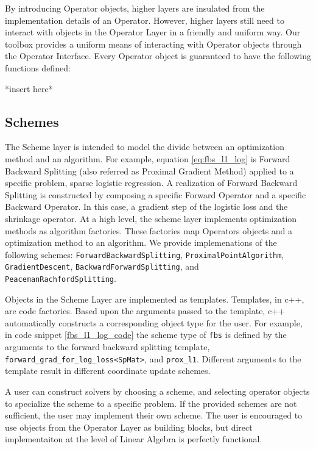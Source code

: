 By introducing Operator objects, higher layers are insulated from the implementation details of an Operator. 
However, higher layers still need to interact with objects in the Operator Layer in a friendly and uniform way.
Our toolbox provides a uniform means of interacting with Operator objects through the Operator Interface.
Every Operator object is guaranteed to have the following functions defined:

*insert here*

\subsection{Schemes}

The Scheme layer is intended to model the divide between an optimization method and an algorithm. 
For example, equation \ref{eq:fbs_l1_log} is Forward Backward Splitting (also referred as Proximal Gradient Method) applied to a specific problem, sparse logistic regression.
 A realization of  Forward Backward Splitting is constructed by composing a specific Forward Operator and a specific Backward Operator.
 In this case, a gradient step of the logistic loss and the shrinkage operator. 
At a high level, the scheme layer implements optimization methods as algorithm factories.
These factories map Operators objects and a optimization method to an algorithm.  
We provide implemenations of the following schemes: \texttt{ForwardBackwardSplitting}, \texttt{ProximalPointAlgorithm},  \texttt{GradientDescent}, \texttt{BackwardForwardSplitting}, and \texttt{PeacemanRachfordSplitting}.

Objects in the Scheme Layer are implemented as templates.
Templates, in c++, are code factories.
Based upon the arguments passed to the template, c++ automatically constructs a corresponding object type for the user.
For example, in code snippet \ref{fbs_l1_log_code} the scheme type of \texttt{fbs} is defined by the arguments to the forward backward splitting template, \texttt{forward\_grad\_for\_log\_loss<SpMat>}, and \texttt{prox\_l1}. 
Different arguments to the template result in different coordinate update schemes.

A user can construct solvers by choosing a scheme, and selecting operator objects to specialize the scheme to a specific problem. 
If the provided schemes are not sufficient, the user may implement their own scheme.
The user is encouraged to use objects from the Operator Layer as building blocks, but direct implementaiton at the level of Linear Algebra is perfectly functional.



